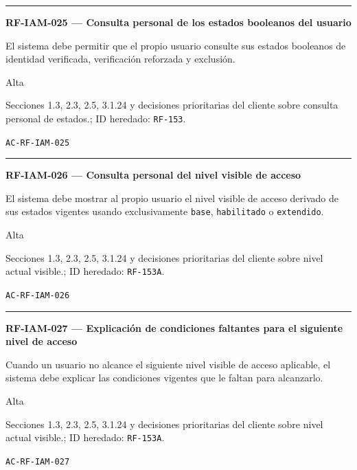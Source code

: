 \documentclass[10pt,letterpaper]{article}
\begin{document}
\vspace{0.25em}\hrule\vspace{0.65em}
\noindent\textbf{RF-IAM-025 --- Consulta personal de los estados booleanos del usuario}\par
\begin{description}[style=nextline,leftmargin=3.15cm,labelwidth=2.8cm,font=\normalfont\bfseries]
\item[Obligación] El sistema debe permitir que el propio usuario consulte sus estados booleanos de identidad verificada, verificación reforzada y exclusión.
\item[Prioridad] Alta
\item[Procedencia] Secciones 1.3, 2.3, 2.5, 3.1.24 y decisiones prioritarias del cliente sobre consulta personal de estados.; ID heredado: \texttt{RF-153}.
\item[Verificación] \texttt{AC-RF-IAM-025}
\end{description}
\vspace{0.25em}\hrule\vspace{0.65em}
\noindent\textbf{RF-IAM-026 --- Consulta personal del nivel visible de acceso}\par
\begin{description}[style=nextline,leftmargin=3.15cm,labelwidth=2.8cm,font=\normalfont\bfseries]
\item[Obligación] El sistema debe mostrar al propio usuario el nivel visible de acceso derivado de sus estados vigentes usando exclusivamente \texttt{base}, \texttt{habilitado} o \texttt{extendido}.
\item[Prioridad] Alta
\item[Procedencia] Secciones 1.3, 2.3, 2.5, 3.1.24 y decisiones prioritarias del cliente sobre nivel actual visible.; ID heredado: \texttt{RF-153A}.
\item[Verificación] \texttt{AC-RF-IAM-026}
\end{description}
\vspace{0.25em}\hrule\vspace{0.65em}
\noindent\textbf{RF-IAM-027 --- Explicación de condiciones faltantes para el siguiente nivel de acceso}\par
\begin{description}[style=nextline,leftmargin=3.15cm,labelwidth=2.8cm,font=\normalfont\bfseries]
\item[Obligación] Cuando un usuario no alcance el siguiente nivel visible de acceso aplicable, el sistema debe explicar las condiciones vigentes que le faltan para alcanzarlo.
\item[Prioridad] Alta
\item[Procedencia] Secciones 1.3, 2.3, 2.5, 3.1.24 y decisiones prioritarias del cliente sobre nivel actual visible.; ID heredado: \texttt{RF-153A}.
\item[Verificación] \texttt{AC-RF-IAM-027}
\end{description}
\end{document}
